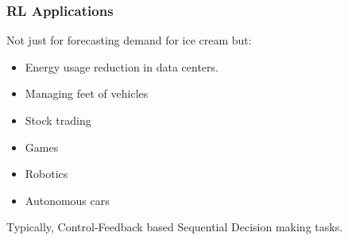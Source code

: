 






\begin{frame}[fragile]\frametitle{RL Applications}
 Not just for forecasting demand for ice cream but:
\begin{itemize}
\item Energy usage reduction in data centers.
\item Managing feet of vehicles
\item Stock trading
\item Games
\item Robotics
\item Autonomous cars
\end{itemize}

Typically, Control-Feedback based Sequential Decision making tasks.

\end{frame}




